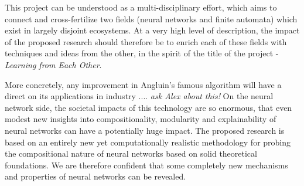 \documentclass[10pt,a4paper]{article}
\begin{document}
		This project can be understood as a multi-disciplinary effort, which aims to connect and cross-fertilize two fields (neural networks and finite automata) which exist in largely disjoint ecosystems. At a very high level of description, the impact of the proposed research should therefore be to enrich each of these fields with techniques and ideas from the other, in the spirit of the title of the project -\emph{Learning from Each Other}. 
		
		More concretely, any improvement in Angluin's famous algorithm will have a direct on its applications in industry .... \textit{ask Alex about this!} 
		On the neural network side, the societal impacts of this technology are so enormous, that even modest new insights into compositionality, modularity and explainability of neural networks can have a potentially huge impact. The proposed research is based on an entirely new yet computationally realistic methodology for probing the compositional nature of neural networks based on solid theoretical foundations. We are therefore confident that some completely new mechanisms and properties of neural networks can be revealed. 

	
	
	
	
\end{document}
